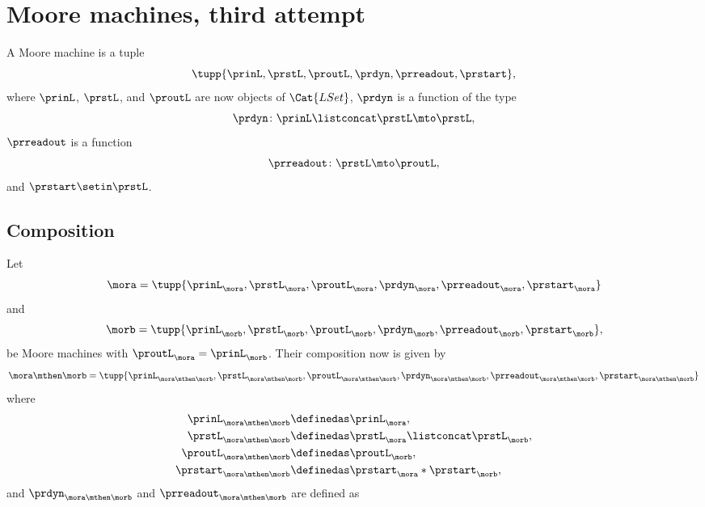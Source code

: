 
\section{Moore machines, third attempt}

\begin{definition}
    \label{def:moore_machine_3rd}
    A Moore machine is a tuple
    \begin{equation}
        \label{eq:moore-tuple-improved-again}
        \tupp{\prinL,\prstL,\proutL,\prdyn,\prreadout,\prstart},
    \end{equation}
    where $\prinL$, $\prstL$, and $\proutL$ are now objects of $\Cat{LSet}$, $\prdyn$ is a function of the type
    \begin{equation}
        \prdyn \colon \prinL \listconcat \prstL \mto \prstL,
    \end{equation}
    $\prreadout$ is a function
    \begin{equation}
        \prreadout \colon \prstL \mto \proutL,
    \end{equation}
    and $\prstart \setin \prstL$.
\end{definition}

\subsection{Composition}

Let
\begin{equation}
    \label{eq:moore-mora-3rd}
    \mora = \tupp{\prinL_{\mora},\prstL_{\mora},\proutL_{\mora},\prdyn_{\mora},\prreadout_{\mora},\prstart_{\mora}}
\end{equation}
%
and
%
\begin{equation}
    \label{eq:moore-morb-3rd}
    \morb = \tupp{\prinL_{\morb},\prstL_{\morb},\proutL_{\morb},\prdyn_{\morb},\prreadout_{\morb},\prstart_{\morb}},
\end{equation}
be Moore machines with $\proutL_{\mora} = \prinL_{\morb}$.
Their composition now is given by
\begin{equation}
    \mora \mthen \morb = \tupp{\prinL_{\mora \mthen \morb},\prstL_{\mora \mthen \morb},\proutL_{\mora \mthen \morb},\prdyn_{\mora \mthen \morb},\prreadout_{\mora \mthen \morb},\prstart_{\mora \mthen \morb}}
\end{equation}
where
%
\begin{equation}
    \label{eq:moore-comp-3rd-1}
    \begin{aligned}
        \prinL_{\mora\mthen\morb}   & \definedas \prinL_{\mora}, \\
        \prstL_{\mora\mthen\morb}   & \definedas \prstL_{\mora} \listconcat  \prstL_{\morb}, \\
        \proutL_{\mora\mthen\morb}  & \definedas \proutL_{\morb}, \\
        \prstart_{\mora\mthen\morb} & \definedas \prstart_{\mora} * \prstart_{\morb},
    \end{aligned}
\end{equation}
and $\prdyn_{\mora \mthen \morb}$ and $\prreadout_{\mora \mthen \morb}$ are defined as


